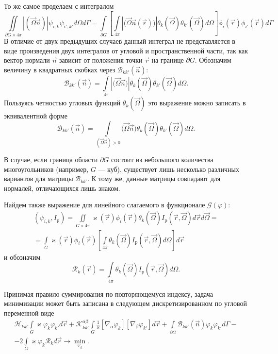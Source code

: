 То же самое проделаем с интегралом
\[
\iint\limits_{\partial G \times 4\pi} |(\vec \Omega \vec n)| \psi_{i,k}\psi_{i',k'} d\Omega d \Gamma = 
\int\limits_{\partial G} \left[\int\limits_{4\pi} \left|\big(\vec \Omega \vec n(\vec r)\big)\right|
\theta_k(\vec \Omega) \theta_{k'}(\vec \Omega) d\Omega\right] \phi_i(\vec r) \phi_{i'}(\vec r) d\Gamma
\]
В отличие от двух предыдущих случаев данный интеграл не представляется в виде произведения двух интегралов от угловой и пространственной части, так как вектор нормали $\vec n$ зависит от положения точки $\vec r$ на границе $\partial G$. Обозначим величину в квадратных скобках через $\mathscr{B}_{kk'}(\vec n)$:
\[
\mathscr{B}_{kk'}(\vec n) = \int\limits_{4\pi} \left|\big(\vec \Omega \vec n\big)\right|
\theta_k(\vec \Omega) \theta_{k'}(\vec \Omega) d\Omega.
\]
Пользуясь четностью угловых функций $\theta_k(\vec \Omega)$ это выражение можно записать в эквивалентной форме
\[
\mathscr{B}_{kk'}(\vec n) = \int\limits_{(\vec \Omega \vec n) > 0} \big(\vec \Omega \vec n\big)
\theta_k(\vec \Omega) \theta_{k'}(\vec \Omega) d\Omega.
\]

В случае, если граница области $\partial G$ состоит из небольшого количества многоугольников (например, $G$ --- куб), существует лишь несколько различных вариантов для матрицы $\mathscr{B}_{kk'}$. К тому же, данные матрицы совпадают для нормалей, отличающихся лишь знаком.

Найдем также выражение для линейного слагаемого в функционале $\mathcal{G}(\varphi)$:
\begin{multline*}
(\psi_{i,k}, I_\text{p}) = \iint\limits_{G \times 4\pi} \varkappa(\vec r) \phi_i(\vec r) \theta_k(\vec \Omega) I_\text{p} (\vec r, \vec \Omega) d\vec r d\vec \Omega = \\ =
\int\limits_{G} \varkappa(\vec r) \phi_i(\vec r) \left[
\int\limits_{4\pi} \theta_k(\vec \Omega) I_\text{p}(\vec r, \vec \Omega) d\Omega
\right] d\vec r
\end{multline*}
и обозначим
\[
\mathscr{R}_{k}(\vec r) = \int\limits_{4\pi} \theta_k(\vec \Omega) I_\text{p}(\vec r, \vec \Omega) d\Omega.
\]

Принимая правило суммирования по повторяющемуся индексу, задача минимизации может быть записана в следующем дискретизированном по угловой переменной виде
\begin{multline*}
\mathscr H_{kk'} \int\limits_{G} \varkappa \varphi_k \varphi_{k'} d\vec r +
\mathscr K_{kk'}^{\alpha\beta} \int\limits_{G} \frac{1}{\varkappa} [\nabla_\alpha \varphi_{k}] [\nabla_\beta \varphi_{k'}] d\vec r +
\int\limits_{\partial G} \mathscr B_{kk'}(\vec n) \varphi_{k}\varphi_{k'} d\Gamma - \\ - 2 \int\limits_{G}
\varkappa \varphi_k \mathscr{R}_k d\vec r \to \min_{\varphi_k}.
\end{multline*}

